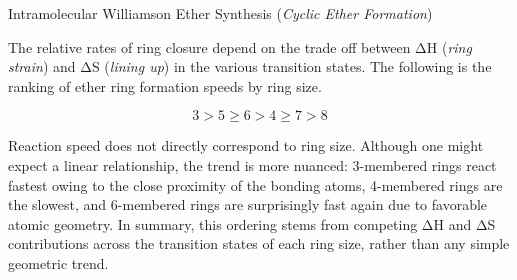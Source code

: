\documentclass[10pt]{article}
\begin{document}
\begin{core}{Intramolecular Williamson Ether Synthesis (\textit{Cyclic Ether Formation})}

    The relative rates of ring closure depend on the trade off between ΔH (\textit{ring strain}) and ΔS (\textit{lining up}) in the various transition states. The following is the ranking of ether ring formation speeds by ring size.

    \[
      3 > 5 \geq 6 > 4 \geq 7 > 8
    \]

    Reaction speed does not directly correspond to ring size. Although one might expect a linear relationship, the trend is more nuanced: 3-membered rings react fastest owing to the close proximity of the bonding atoms, 4-membered rings are the slowest, and 6-membered rings are surprisingly fast again due to favorable atomic geometry. In summary, this ordering stems from competing ΔH and ΔS contributions across the transition states of each ring size, rather than any simple geometric trend.


\end{core}
\end{document}
